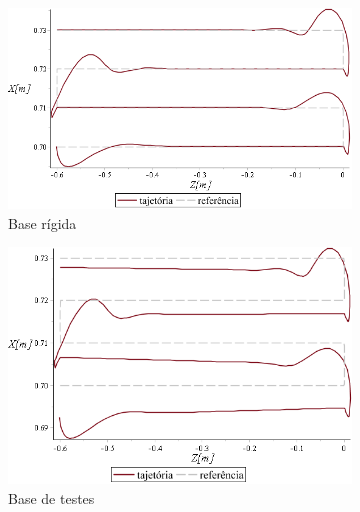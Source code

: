 \begin{figure}[h]
    \centering
    \begin{subfigure}[b]{0.48\textwidth}
        \includegraphics[width=\textwidth]{figs/t1_traj_base_rig}
        \caption{Base rígida}
        \label{fig::t1_traj_base_rig}
    \end{subfigure}
    \quad %
    \begin{subfigure}[b]{0.48\textwidth}
        \includegraphics[width=\textwidth]{figs/t1_traj_base_testes}
        \caption{Base de testes}
        \label{fig::t1_traj_base_testes}
    \end{subfigure}
    \quad %
    \begin{subfigure}[b]{0.48\textwidth}

\end{subfigure}
\end{figure}
